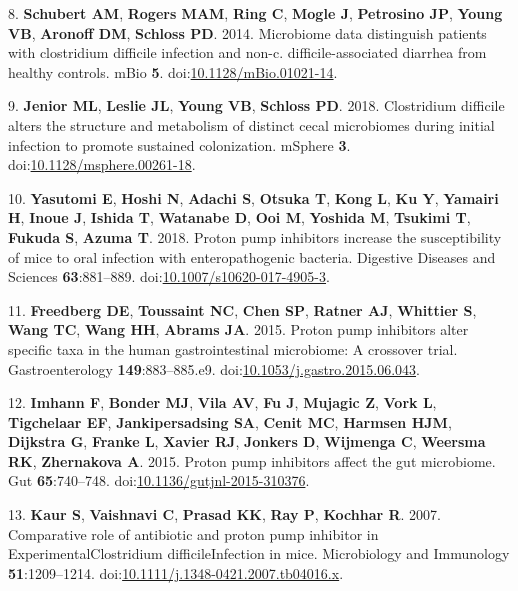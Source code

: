 \documentclass[11pt,]{article}
\begin{document}
\hypertarget{ref-Schuberte01021-14}{}
8. \textbf{Schubert AM}, \textbf{Rogers MAM}, \textbf{Ring C},
\textbf{Mogle J}, \textbf{Petrosino JP}, \textbf{Young VB},
\textbf{Aronoff DM}, \textbf{Schloss PD}. 2014. Microbiome data
distinguish patients with clostridium difficile infection and non-c.
difficile-associated diarrhea from healthy controls. mBio \textbf{5}.
doi:\href{https://doi.org/10.1128/mBio.01021-14}{10.1128/mBio.01021-14}.

\hypertarget{ref-Jenior2018}{}
9. \textbf{Jenior ML}, \textbf{Leslie JL}, \textbf{Young VB},
\textbf{Schloss PD}. 2018. Clostridium difficile alters the structure
and metabolism of distinct cecal microbiomes during initial infection to
promote sustained colonization. mSphere \textbf{3}.
doi:\href{https://doi.org/10.1128/msphere.00261-18}{10.1128/msphere.00261-18}.

\hypertarget{ref-Yasutomi2018}{}
10. \textbf{Yasutomi E}, \textbf{Hoshi N}, \textbf{Adachi S},
\textbf{Otsuka T}, \textbf{Kong L}, \textbf{Ku Y}, \textbf{Yamairi H},
\textbf{Inoue J}, \textbf{Ishida T}, \textbf{Watanabe D}, \textbf{Ooi
M}, \textbf{Yoshida M}, \textbf{Tsukimi T}, \textbf{Fukuda S},
\textbf{Azuma T}. 2018. Proton pump inhibitors increase the
susceptibility of mice to oral infection with enteropathogenic bacteria.
Digestive Diseases and Sciences \textbf{63}:881--889.
doi:\href{https://doi.org/10.1007/s10620-017-4905-3}{10.1007/s10620-017-4905-3}.

\hypertarget{ref-Freedberg2015}{}
11. \textbf{Freedberg DE}, \textbf{Toussaint NC}, \textbf{Chen SP},
\textbf{Ratner AJ}, \textbf{Whittier S}, \textbf{Wang TC}, \textbf{Wang
HH}, \textbf{Abrams JA}. 2015. Proton pump inhibitors alter specific
taxa in the human gastrointestinal microbiome: A crossover trial.
Gastroenterology \textbf{149}:883--885.e9.
doi:\href{https://doi.org/10.1053/j.gastro.2015.06.043}{10.1053/j.gastro.2015.06.043}.

\hypertarget{ref-Imhann2015}{}
12. \textbf{Imhann F}, \textbf{Bonder MJ}, \textbf{Vila AV}, \textbf{Fu
J}, \textbf{Mujagic Z}, \textbf{Vork L}, \textbf{Tigchelaar EF},
\textbf{Jankipersadsing SA}, \textbf{Cenit MC}, \textbf{Harmsen HJM},
\textbf{Dijkstra G}, \textbf{Franke L}, \textbf{Xavier RJ},
\textbf{Jonkers D}, \textbf{Wijmenga C}, \textbf{Weersma RK},
\textbf{Zhernakova A}. 2015. Proton pump inhibitors affect the gut
microbiome. Gut \textbf{65}:740--748.
doi:\href{https://doi.org/10.1136/gutjnl-2015-310376}{10.1136/gutjnl-2015-310376}.

\hypertarget{ref-Kaur2007}{}
13. \textbf{Kaur S}, \textbf{Vaishnavi C}, \textbf{Prasad KK},
\textbf{Ray P}, \textbf{Kochhar R}. 2007. Comparative role of antibiotic
and proton pump inhibitor in ExperimentalClostridium difficileInfection
in mice. Microbiology and Immunology \textbf{51}:1209--1214.
doi:\href{https://doi.org/10.1111/j.1348-0421.2007.tb04016.x}{10.1111/j.1348-0421.2007.tb04016.x}.
\end{document}
